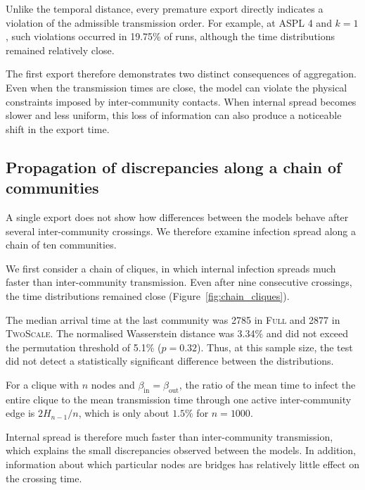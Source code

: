 \documentclass[a4paper,fleqn]{cas-sc}
\newcommand{\Full}{\textup{\textsc{Full}}}
\newcommand{\TS}{\textup{\textsc{TwoScale}}}
\begin{document}
Unlike the temporal distance, every premature export directly indicates a violation of the admissible transmission order. For example, at ASPL 4 and $k=1$, such violations occurred in 19.75\% of runs, although the time distributions remained relatively close.

The first export therefore demonstrates two distinct consequences of aggregation. Even when the transmission times are close, the model can violate the physical constraints imposed by inter-community contacts. When internal spread becomes slower and less uniform, this loss of information can also produce a noticeable shift in the export time.


\subsection{Propagation of discrepancies along a chain of communities}
\label{sec:res_chain_random}

A single export does not show how differences between the models behave after several inter-community crossings. We therefore examine infection spread along a chain of ten communities.

We first consider a chain of cliques, in which internal infection spreads much faster than inter-community transmission. Even after nine consecutive crossings, the time distributions remained close (Figure~\ref{fig:chain_cliques}).

The median arrival time at the last community was 2785 in \Full{} and 2877 in \TS{}. The normalised Wasserstein distance was 3.34\% and did not exceed the permutation threshold of 5.1\% ($p=0.32$). Thus, at this sample size, the test did not detect a statistically significant difference between the distributions.

For a clique with $n$ nodes and $\beta_{\mathrm{in}}=\beta_{\mathrm{out}}$, the ratio of the mean time to infect the entire clique to the mean transmission time through one active inter-community edge is $2H_{n-1}/n$, which is only about $1.5\%$ for $n=1000$.

Internal spread is therefore much faster than inter-community transmission, which explains the small discrepancies observed between the models. In addition, information about which particular nodes are bridges has relatively little effect on the crossing time.
\end{document}
